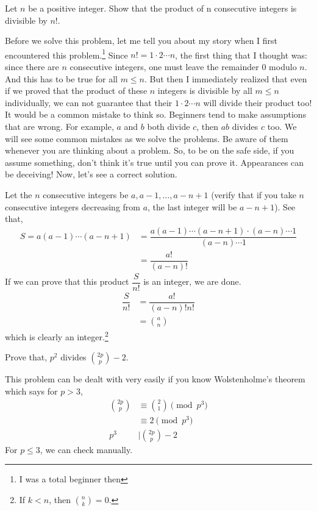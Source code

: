 \documentclass[problems.tex]{subfile}
\begin{document}
	\begin{problem}\label{prob:productdividesfactorial}
		Let $n$ be a positive integer. Show that the product of n consecutive integers is divisible by $n!$.
	\end{problem}
Before we solve this problem, let me tell you about my story when I first encountered this problem.\footnote{I was a total beginner then \blacksmiley} Since $n!=1\cdot2\cdots n$, the first thing that I thought was: since there are $n$ consecutive integers, one must leave the remainder $0$ modulo $n$. And this has to be true for all $m\leq n$. But then I immediately realized that even if we proved that the product of these $n$ integers is divisible by all $m\leq n$ individually, we can not guarantee that their $1\cdot2\cdots n$ will divide their product too! It would be a common mistake to think so. Beginners tend to make assumptions that are wrong. For example, $a$ and $b$ both divide $c$, then $ab$ divides $c$ too. We will see some common mistakes as we solve the problems. Be aware of them whenever you are thinking about a problem. So, to be on the safe side, if you assume something, don't think it's true until you can prove it. Appearances can be deceiving! Now, let's see a correct solution.
	\begin{solution}
		Let the $n$ consecutive integers be $a,a-1,\ldots,a-n+1$ (verify that if you take $n$ consecutive integers decreasing from $a$, the last integer will be $a-n+1$). See that,
			\begin{align*}
				S=a(a-1)\cdots(a-n+1) & = \dfrac{a(a-1)\cdots(a-n+1)\cdot(a-n)\cdots1}{(a-n)\cdots1}\\
									& = \dfrac{a!}{(a-n)!}
			\end{align*}
		If we can prove that this product $\dfrac{S}{n!}$ is an integer, we are done.
			\begin{align*}
				\dfrac{S}{n!} & = \dfrac{a!}{(a-n)!n!}\\
							  & = \binom{a}{n}
			\end{align*}
		which is clearly an integer.\footnote{If $k<n$, then $\binom{n}{k}=0$.}
	\end{solution}
	
	\begin{problem}
		Prove that, $p^2$ divides $\binom{2p}{p}-2$.
	\end{problem}
	
	\begin{solution}
		This problem can be dealt with very easily if you know Wolstenholme's theorem which says for $p>3$,
			\begin{align*}
				\binom{2p}{p} & \equiv\binom{2}{1}\pmod{p^3}\\
							  & \equiv2\pmod{p^3}\\
						p^3 & |\binom{2p}p-2
			\end{align*}
		For $p\leq3$, we can check manually.
	\end{solution}
	
\end{document}

